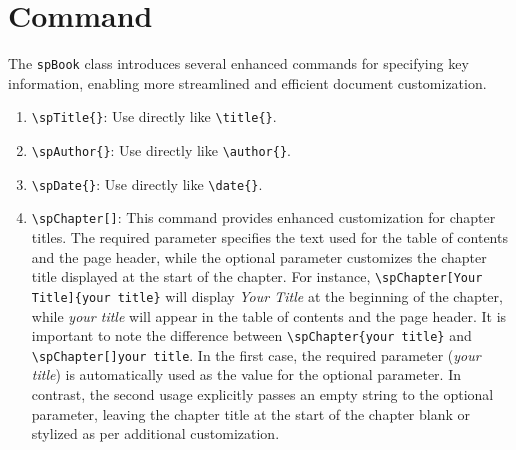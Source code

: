 \section{Command}
    The \texttt{spBook} class introduces several enhanced commands for specifying key information, enabling more streamlined and efficient document customization.
    \begin{enumerate}
        \item \texttt{\textbackslash spTitle\{\}}: Use directly like \texttt{\textbackslash title\{\}}.
        \item \texttt{\textbackslash spAuthor\{\}}: Use directly like \texttt{\textbackslash author\{\}}.
        \item \texttt{\textbackslash spDate\{\}}: Use directly like \texttt{\textbackslash date\{\}}.
        \item \texttt{\textbackslash spChapter[]{}}: This command provides enhanced customization for chapter titles. The required parameter specifies the text used for the table of contents and the page header, while the optional parameter customizes the chapter title displayed at the start of the chapter. For instance, \texttt{\textbackslash spChapter[Your Title]\{your title\}} will display \emph{Your Title} at the beginning of the chapter, while \emph{your title} will appear in the table of contents and the page header. It is important to note the difference between \texttt{\textbackslash spChapter\{your title\}} and \texttt{\textbackslash spChapter[]{your title}}. In the first case, the required parameter (\emph{your title}) is automatically used as the value for the optional parameter. In contrast, the second usage explicitly passes an empty string to the optional parameter, leaving the chapter title at the start of the chapter blank or stylized as per additional customization.
    \end{enumerate}